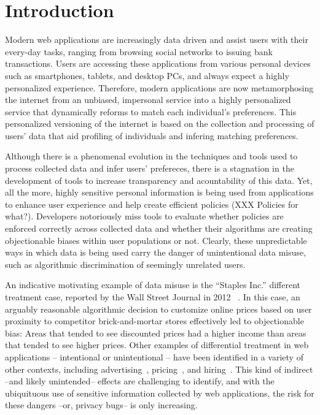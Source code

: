 
\section{Introduction}

Modern web applications are increasingly data driven and assist users
with their every-day tasks, ranging from browsing social networks to
issuing bank transactions. Users are accessing these applications from
various personal devices such as smartphones, tablets, and desktop PCs,
and always expect a highly personalized experience. Therefore, modern
applications are now metamorphosing the internet from an unbiased, impersonal
service into a highly personalized service that dynamically reforms to match
each individual's preferences. This personalized versioning of the internet
is based on the collection and processing of users' data that aid profiling
of individuals and infering matching preferences.

Although there is a phenomenal evolution in the techniques and tools used to
process collected data and infer users' prefereces, there is a stagnation
in the development of tools to increase transparency and acountability of
this data. Yet, all the more,  highly sensitive personal information is being
used from applications to enhance user experience and help create efficient
policies (XXX Policies for what?).
Developers notoriously miss tools to evaluate whether policies are
enforced correctly across collected data and whether their algorithms are
creating objectionable biases within user populations or not. Clearly,
these unpredictable ways in which data is being used carry the danger of
unintentional data misuse, such as algorithmic discrimination of seemingly
unrelated users.

An indicative motivating example of data misuse is the ``Staples Inc.''
different treatment case, reported by the Wall Street Journal in 2012
~\cite{Staples}. In this case, an arguably reasonable algorithmic decision
to customize online prices based on user proximity to competitor
brick-and-mortar stores effectively led to objectionable bias:
Areas that tended to see discounted prices had a higher income than areas
that tended to see higher prices. Other examples of differential treatment in
web applications – intentional or unintentional – have been identified in a
variety of other contexts, including
advertising~\cite{Sweeney:AdDiscrimination},
pricing~\cite{Hannak:PriceDiscrimination},
and hiring~\cite{acquisiti:HiringDiscrimination}.
This kind of indirect --and likely unintended-- effects are challenging to
identify, and with the ubiquituous use of sensitive information collected by
web applications, the risk for these dangers --or, privacy bugs-- is only increasing.

